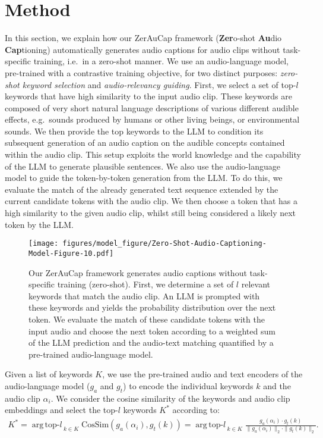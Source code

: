 \documentclass{article}
\DeclareMathOperator*{\argtopk}{\mathop{\mathrm{arg\,top}}-\textit{l}\,}
\newcommand{\modelName}{ZerAuCap\xspace}
\newcommand{\mypara}[1]{\vspace{2pt}\noindent{\bf{#1}}}
\begin{document}
\section{Method}
In this section, we explain how our \modelName
framework (\textbf{Zer}o-shot \textbf{Au}dio \textbf{Cap}tioning) automatically generates audio captions for audio clips without task-specific training, i.e.\ in a zero-shot manner.
We use an audio-language model, pre-trained with a contrastive training objective, for two distinct purposes: \emph{zero-shot keyword selection} and \emph{audio-relevancy guiding}.
First, we select a set of top-$l$ keywords that have high similarity to the input audio clip.
These keywords are composed of very short natural language descriptions of various different audible effects, e.g.\ sounds produced by humans or other living beings, or environmental sounds.
We then provide the top keywords to the LLM to condition its subsequent generation of an audio caption on the audible concepts contained within the audio clip.
This setup exploits the world knowledge and the capability of the LLM to generate plausible sentences.
We also use the audio-language model to guide the token-by-token generation from the LLM\@. To do this, we evaluate the match of the already generated text sequence extended by the current candidate tokens with the audio clip. We then choose a token that has a high similarity to the given audio clip, whilst still being considered a likely next token by the LLM\@.

\begin{figure}[t]
    \vspace{-2ex}
    \centering
    \texttt{[image: figures/model\_figure/Zero-Shot-Audio-Captioning-Model-Figure-10.pdf]}
    \caption{Our \modelName framework generates audio captions without task-specific training (zero-shot). First, we determine a set of $l$ relevant keywords that match the audio clip. An LLM is prompted with these keywords and yields the probability distribution over the next token. We evaluate the match of these candidate tokens with the input audio and choose the next token according to a weighted sum of the LLM prediction and the audio-text matching quantified by a pre-trained audio-language model.
    }\label{fig:model-figure}
    \vspace{-2ex}
\end{figure}

\mypara{Zero-shot keyword selection.}
Given a list of keywords $K$, we use the pre-trained audio and text encoders of the audio-language model ($g_a$ and $g_t$) to encode the individual keywords $k$ and the audio clip $\alpha_i$. We consider the cosine similarity of the keywords and audio clip embeddings and select the top-$l$ keywords $K^*$ according to:
\begin{align}
    K^* = \argtopk_{k \in K} \text{CosSim} \left(g_a(\alpha_i),g_t(k)\right)
    = \argtopk_{k \in K} \frac{g_a(\alpha_i) \cdot g_t(k)}{\|g_a(\alpha_i)\|_2 \cdot \|g_t(k)\|_2}.
\end{align}
\end{document}
